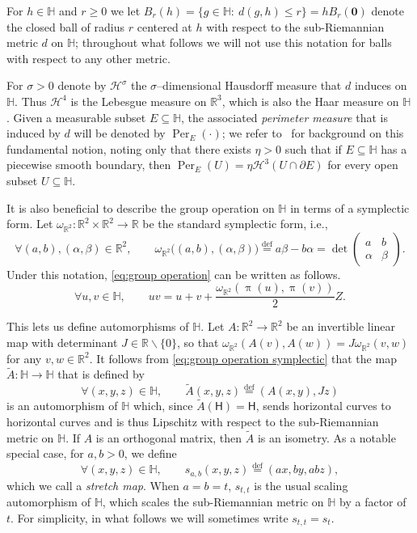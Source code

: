 \documentclass[11pt,reqno]{amsart}
\renewcommand{\H}{\mathbb{H}}
\newcommand{\R}{\mathbb{R}}
\newcommand{\cH}{\mathcal{H}}
\newcommand{\0}{\mathbf{0}}
\renewcommand{\1}{\mathbf 1}
\newcommand{\from}{\colon}
\renewcommand{\subset}{\subseteq}
\newcommand{\eqdef}{\stackrel{\mathrm{def}}{=}}
\renewcommand{\ge}{\geqslant}
\renewcommand{\le}{\leqslant}
\renewcommand{\setminus}{\smallsetminus}
\theoremstyle{remark}
\DeclareMathOperator{\Per}{Per}
\begin{document}
For $h\in \H$ and $r\ge 0$  we let $B_r(h)=\{g\in \H:\ d(g,h)\le r\}= hB_r(\0)$ denote the closed ball of radius $r$ centered at $h$ with respect to the sub-Riemannian metric $d$ on $\H$; throughout what follows we will not use this notation for balls with respect to any other metric.

For $\sigma>0$ denote by $\cH^\sigma$ the $\sigma$--dimensional Hausdorff measure that $d$ induces on $\H$. Thus $\cH^4$ is the Lebesgue measure on $\R^3$, which is also the Haar measure on $\H$. Given a measurable subset $E\subset \H$, the associated {\em perimeter measure} that is induced by $d$ will be denoted by $\Per_E(\cdot)$; we refer to~\cite{FSSCRectifiability} for background on this fundamental notion, noting  only that there exists $\eta>0$ such that if $E\subset \H$ has a piecewise smooth boundary, then  $\Per_E(U)=\eta \cH^3(U\cap \partial E)$ for every open subset $U\subset \H$.


It is  also beneficial to describe the group operation on $\H$ in terms of a symplectic form.  Let $\omega_{\R^2}\from \R^2\times \R^2\to \R$ be the standard symplectic form, i.e.,
$$
\forall (a,b),(\alpha,\beta)\in \R^2,\qquad \omega_{\R^2}\big((a,b),(\alpha,\beta)\big)\eqdef a\beta-b\alpha=\det \begin{pmatrix} a & b \\
           \alpha & \beta
                       \end{pmatrix}.
$$
Under this notation,  \eqref{eq:group operation} can be written as follows.
\begin{equation}\label{eq:group operation symplectic}
\forall  u,v\in \H,\qquad   u v = u+v+ \frac{\omega_{\R^2}(\uppi(u),\uppi(v))}{2} Z.
\end{equation}

This lets us define automorphisms of $\H$.
Let $A\from \R^2\to \R^2$ be an invertible linear map with determinant $J\in \R \setminus \{0\}$, so that $\omega_{\R^2}(A(v),A(w))=J\omega_{\R^2}(v,w)$ for any $v,w\in \R^2$.  It follows from \eqref{eq:group operation symplectic} that the map $\tilde{A}\from \H\to \H$ that is defined by
\begin{equation}\label{eq:def tilde A}
\forall (x,y,z)\in \H,\qquad \tilde{A}(x,y,z)\eqdef(A(x,y), J z)
\end{equation}
is an automorphism of $\H$ which,   since $\tilde{A}(\mathsf{H})=\mathsf{H}$,  sends horizontal curves to horizontal curves and is thus Lipschitz with respect to the sub-Riemannian metric on $\H$.  If $A$ is an orthogonal matrix, then $\tilde{A}$ is an isometry.  As a notable special case, for $a,b>0$, we define
\begin{equation}\label{eq:def s a b}
\forall (x,y,z)\in \H,\qquad s_{a,b}(x,y,z)\eqdef (ax,by,abz),
\end{equation}
which we call a \emph{stretch map}.
When $a=b=t$, $s_{t,t}$ is the usual scaling automorphism of $\H$, which scales the sub-Riemannian metric on $\H$ by a factor of $t$.  For simplicity, in what follows we will sometimes write $s_{t,t}=s_t$.
\end{document}
